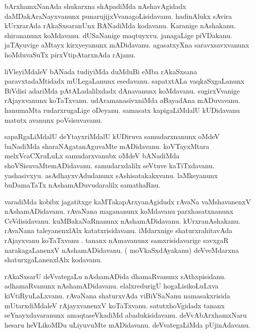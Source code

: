 \documentclass{article}
\begin{document}
\begin{mn}%
bArxhamxNanAda shukarxna shApadiMda nAshavAgidadx daMDakAraNayxvanunx punarujijxVvanagoLisidavanu. 
hadinAlukx sAvira kUrxrarAda rAkaSxsaranUnx BANadiMda kodavanu. Karanige nAshakanu.  shirananunx 
koMdavanu. dUSaNanige maqtuyxvu. janagaLige piVDakanu. jaTAyuvige aMtayx kirxyeyanunx mADidavanu. 
agasatxyXna saravxsavxvanunx hoMduvaSuTx pirxVtipAtarxnAda rAjanu.
\end{mn}

\begin{mn}%
liVleyiMdaleV bANada tudiyiMda duMduBi eMba rAkaSxsana paravxtadaMtidadx mULegaLanunx esedavanu. 
sapatxtALa vaqkaSxgaLanunx BiVdisi adariMda pAtALadalilxdadx dAnavanunx koMdavanu. sugirxVvanige 
rAjayxvanunx koTaTxvanu. udAramanasivxniMda aBayadAna mADuvavanu. hanumaMta rudarxrugaLige 
oDeyanu. samasatx kapigaLiMdalU kUDidavanu matutx avanunx poVsisuvavanu.
\end{mn}

\begin{mn}%
sapaRgaLiMdalU deYtayxriMdalU kUDiruva samudarxnanunx oMdeV baNadiMda sharaNAgatanAguvaMte 
mADidavanu. koVTayxMtara melxVcaCXruLuLx samudarxvanubx oMdeV bANadiMda shoVSisuvaMtemADidavanu. 
samudarxdalilx seVtuve kaTiTxdavanu. yashasivxyu. asAdhayxvAdudanunx sAshisatakakxvanu. 
laMkeyanunx buDamaTaTx nAshamADuvudaralilx samathaRnu.
\end{mn}

\begin{mn}%
varadiMda kobibx jagatitxge kaMTakapArxyanAgidudx rAvaNa vaMshavanenxV nAshamADidavanu. rAvaNana 
magananunx koMdavanu parxhasatxnanunx CeVdisidavanu. kuMBakaNaRnanunx nAshamADidavanu. 
kUrxranAshakanu. rAvaNana taleyanenxlAlx katatxrisidavanu. iMdarxnige shaturxrahitavAda rAjayxvanu 
koTaTxvanu . tananx nAmavanunx samxrisidavarige savxgaR narakagaLanenxV nAshamADidavanu. ( 
moVkaSxdAyakanu) deVveMdarxna shaturxgaLanenxlAlx kodavanu.
\end{mn}

\begin{mn}%
rAkaSxsarU deVvategaLu nAshamADida dhamaRvanunx sAthxpisidanu. adhamaRvanunx nAshamADidavanu. 
elalxredurigU hogaLisikoLuLxva kiVtiRyuLaLxvanu. rAvaNana shaturxvAda viBiVSaNanu namasakxrisida 
mUtarxdiMdaleV rAjayxvanenxV koTaTxvanu. satutxhoVgidadx tananx seYnayxdavaranunx amaqtaseVkadiMd 
abadukisidavanu. deVvAbArxhamxNaru hesaru heVLikoMDu uLiyuvuMte mADidavanu. deVvategaLiMda 
pUjinAdavanu. 
\end{mn}
\end{document}

